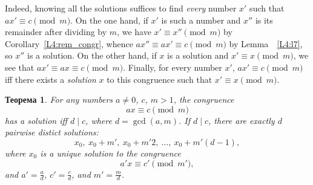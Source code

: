 \documentclass[12pt,notitlepage]{article}
\theoremstyle{plain}
\newtheorem{thm}{Теорема}[section]
\theoremstyle{definition}
\theoremstyle{plain}
\newcommand{\1}{\mathbf{1}}
\newcommand{\0}{\mathbf{0}}
\newcommand{\dvd}{\mathop{\mid}}
\begin{document}
Indeed, knowing all the solutions suffices to find \emph{every} number $x'$ such that $ax' \equiv c \pmod m$. On the one hand, if $x'$ is such a number and $x''$ is its remainder after dividing by $m$, we have $x' \equiv x'' \pmod m$ by Corollary~\ref{L4:rem_congr}, whence $a x'' \equiv ax' \equiv c \pmod m$ by Lemma~~\ref{L4:l7}, so $x''$ is a solution. On the other hand, if $x$ is a solution and $x' \equiv x \pmod m$, we see that $ax' \equiv ax \equiv c \pmod m$. Finally, for every number $x'$, $a x' \equiv c \pmod m$ iff there exists a \emph{solution} $x$ to this congruence such that $x' \equiv x \pmod m$.

\begin{thm}\label{L6:t_cong} For any numbers $a \neq 0$, $c$, $m > 1$, the congruence
	\begin{equation}\label{L6:eq1}
		a x \equiv c \pmod m
	\end{equation}
	has a solution iff $d \dvd c$, where $d = \gcd(a, m)$. If $d \dvd c$, there are exactly $d$ pairwise distict solutions:
	$$x_0,\ x_0 + m',\ x_0 +m'2,\ \ldots,\ x_0 + m'(d - 1),$$
	where $x_0$ is a unique solution to the congruence
	\begin{equation}\label{L6:eq2}
		a' x \equiv c' \pmod {m'},
	\end{equation}
	and $a' = \frac{a}{d}$, $c' = \frac{c}{d}$, and  $m' = \frac{m}{d}$.
\end{thm}
\end{document}
